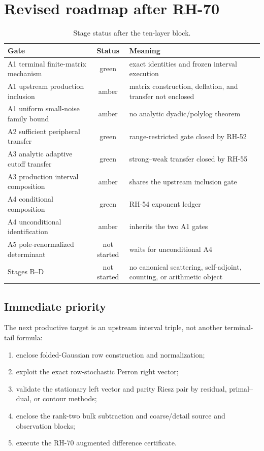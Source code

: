 \documentclass[11pt]{article}
\theoremstyle{definition}
\begin{document}
\section{Revised roadmap after RH-70}
\label{sec:roadmap}

\begin{table}[H]
\centering
\small
\caption{Stage status after the ten-layer block.}
\label{tab:stages}
\begin{tabular}{L{0.38\textwidth}cL{0.40\textwidth}}
\toprule
Gate & Status & Meaning\\
\midrule
A1 terminal finite-matrix mechanism & green & exact identities and frozen interval execution\\
A1 upstream production inclusion & amber & matrix construction, deflation, and transfer not enclosed\\
A1 uniform small-noise family bound & amber & no analytic dyadic/polylog theorem\\
A2 sufficient peripheral transfer & green & range-restricted gate closed by RH-52\\
A3 analytic adaptive cutoff transfer & green & strong--weak transfer closed by RH-55\\
A3 production interval composition & amber & shares the upstream inclusion gate\\
A4 conditional composition & green & RH-54 exponent ledger\\
A4 unconditional identification & amber & inherits the two A1 gates\\
A5 pole-renormalized determinant & not started & waits for unconditional A4\\
Stages B--D & not started & no canonical scattering, self-adjoint, counting, or arithmetic object\\
\bottomrule
\end{tabular}
\end{table}

\subsection{Immediate priority}

The next productive target is an upstream interval triple, not another
terminal-tail formula:

\begin{enumerate}[leftmargin=2.2em]
 \item enclose folded-Gaussian row construction and normalization;
 \item exploit the exact row-stochastic Perron right vector;
 \item validate the stationary left vector and parity Riesz pair by residual,
       primal--dual, or contour methods;
 \item enclose the rank-two bulk subtraction and coarse/detail source and
       observation blocks;
 \item execute the RH-70 augmented difference certificate.
\end{enumerate}
\end{document}
